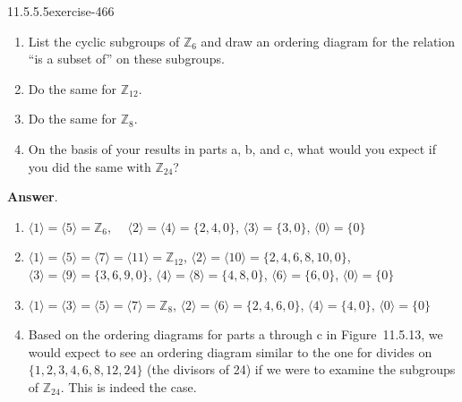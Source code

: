 \documentclass[twoside,10pt,]{book}
\numberwithin{equation}{section}
\begin{document}
\begin{divisionsolution}{11.5.5.5}{}{exercise-466}%
\hypertarget{p-4130}{}%
\leavevmode%
\begin{enumerate}[label=(\alph*)]
\item\hypertarget{li-1877}{}\hypertarget{p-4131}{}%
List the cyclic subgroups of \(\mathbb{Z}_6\) and draw an ordering diagram for the relation ``is a subset of'' on these subgroups.%
\item\hypertarget{li-1878}{}\hypertarget{p-4132}{}%
Do the same for \(\mathbb{Z}_{12}\).%
\item\hypertarget{li-1879}{}\hypertarget{p-4133}{}%
Do the same for \(\mathbb{Z}_8\).%
\item\hypertarget{li-1880}{}\hypertarget{p-4134}{}%
On the basis of your results in parts a, b, and c, what would you expect if you did the same with \(\mathbb{Z}_{24}\)?%
\end{enumerate}
%
\par\smallskip%
\noindent\textbf{Answer}.\quad%
\hypertarget{p-4135}{}%
\leavevmode%
\begin{enumerate}[label=(\alph*)]
\item\hypertarget{li-1881}{}\hypertarget{p-4136}{}%
\(\langle 1\rangle  = \langle 5\rangle  = \mathbb{Z}_6\), \(\quad\)\(\langle 2\rangle = \langle 4\rangle  = \{2, 4, 0\}\), \(\langle 3\rangle = \{3, 0\}\), \(\langle 0\rangle  = \{0\}\)%
\item\hypertarget{li-1882}{}\hypertarget{p-4137}{}%
\(\langle 1\rangle  = \langle 5\rangle  = \langle 7\rangle  = \langle 11\rangle  =\mathbb{Z}_{12}\), \(\langle 2\rangle = \langle 10\rangle  = \{2, 4, 6, 8, 10, 0\}\), \(\langle 3\rangle = \langle 9\rangle  = \{3, 6, 9, 0\}\), \(\langle 4\rangle = \langle  8 \rangle  = \{ 4 , 8, 0\}\), \(\langle 6\rangle  = \{6, 0\}\), \(\langle 0\rangle  = \{0\}\)%
\item\hypertarget{li-1883}{}\hypertarget{p-4138}{}%
\(\langle 1\rangle  = \langle  3\rangle  = \langle  5 \rangle  = \langle 7\rangle  = \mathbb{Z}_8\), \(\langle 2\rangle  = \langle 6\rangle  = \{2, 4, 6, 0\}\), \(\langle 4\rangle  = \{4, 0\}\), \(\langle 0\rangle  = \{0\}\)%
\item\hypertarget{li-1884}{}\hypertarget{p-4139}{}%
Based on the ordering diagrams for parts a through c in Figure~11.5.13, we would expect to see an ordering diagram similar to the one for divides on \(\{1, 2, 3,
4, 6, 8, 12, 24\}\) (the divisors of 24) if we were to examine the subgroups of \(\mathbb{Z}_{24}\). This is indeed the case.%
\end{enumerate}

\end{divisionsolution}
\end{document}
